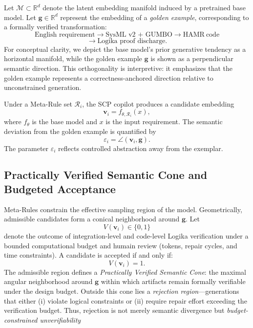 \documentclass[conference]{IEEEtran}
\begin{document}
Let $\mathcal{M} \subset \mathbb{R}^d$ denote the latent embedding manifold induced by a pretrained base model. Let $\mathbf{g} \in \mathbb{R}^d$ represent the embedding of a \emph{golden example}, corresponding to a formally verified transformation:
\[
\text{English requirement}
\rightarrow
\text{SysML v2 + GUMBO}
\rightarrow
\text{HAMR}~\text{code}\]
\[\rightarrow
\text{Logika proof discharge}.
\]
For conceptual clarity, we depict the base model’s prior generative tendency as a horizontal manifold, while the golden example $\mathbf{g}$ is shown as a perpendicular semantic direction. This orthogonality is interpretive: it emphasizes that the golden example represents a correctness-anchored direction relative to unconstrained generation.

Under a Meta-Rule set $\mathcal{R}_i$, the SCP copilot produces a candidate embedding
\begin{equation}
\mathbf{v}_i = f_{\theta,\mathcal{R}_i}(x),
\end{equation}
where $f_{\theta}$ is the base model and $x$ is the input requirement. The semantic deviation from the golden example is quantified by
\begin{equation}
\varepsilon_i = \angle(\mathbf{v}_i,\mathbf{g}).
\end{equation}
The parameter $\varepsilon_i$ reflects controlled abstraction away from the exemplar.

\subsection{Practically Verified Semantic Cone and Budgeted Acceptance}

Meta-Rules constrain the effective sampling region of the model. Geometrically, admissible candidates form a conical neighborhood around $\mathbf{g}$. Let
\[
V(\mathbf{v}_i)\in\{0,1\}
\]
denote the outcome of integration-level and code-level Logika verification under a bounded computational budget and humain review (tokens, repair cycles, and time constraints). A candidate is accepted if and only if:
\begin{equation}
V(\mathbf{v}_i)=1.
\end{equation}
The admissible region defines a \emph{Practically Verified Semantic Cone}: the maximal angular neighborhood around $\mathbf{g}$ within which artifacts remain formally verifiable under the design budget. Outside this cone lies a \emph{rejection region}---generations that either (i) violate logical constraints or (ii) require repair effort exceeding the verification budget. Thus, rejection is not merely semantic divergence but \emph{budget-constrained unverifiability} %
\end{document}

